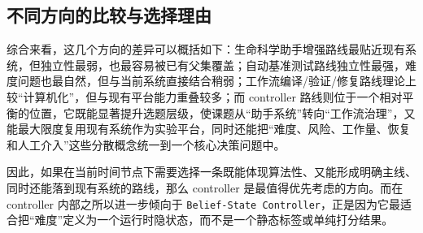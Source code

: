 \subsection{不同方向的比较与选择理由}

综合来看，这几个方向的差异可以概括如下：生命科学助手增强路线最贴近现有系统，但独立性最弱，也最容易被已有父集覆盖；自动基准测试路线独立性最强，难度问题也最自然，但与当前系统直接结合稍弱；工作流编译/验证/修复路线理论上较“计算机化”，但与现有平台能力重叠较多；而 controller 路线则位于一个相对平衡的位置，它既能显著提升选题层级，使课题从“助手系统”转向“工作流治理”，又能最大限度复用现有系统作为实验平台，同时还能把“难度、风险、工作量、恢复和人工介入”这些分散概念统一到一个核心决策问题中。

因此，如果在当前时间节点下需要选择一条既能体现算法性、又能形成明确主线、同时还能落到现有系统的路线，那么 controller 是最值得优先考虑的方向。而在 controller 内部之所以进一步倾向于 \texttt{Belief-State Controller}，正是因为它最适合把“难度”定义为一个运行时隐状态，而不是一个静态标签或单纯打分结果。

